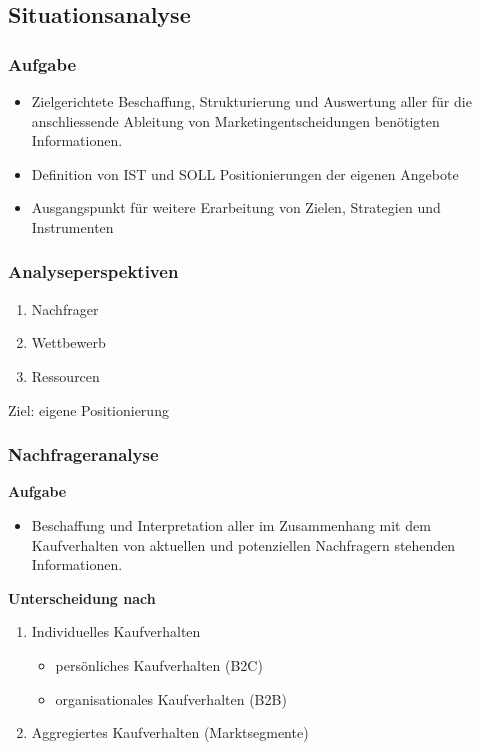 \subsection{Situationsanalyse}
\subsubsection{Aufgabe}
\begin{itemize}
	\item Zielgerichtete Beschaffung, Strukturierung und Auswertung aller für die anschliessende Ableitung von Marketingentscheidungen benötigten Informationen.
	\item Definition von IST und SOLL Positionierungen der eigenen Angebote
	\item Ausgangspunkt für weitere Erarbeitung von Zielen, Strategien und Instrumenten
\end{itemize}

\subsubsection{Analyseperspektiven}
\begin{multicols}{3}
	\begin{enumerate}
		\item Nachfrager
		\item Wettbewerb
		\item Ressourcen
	\end{enumerate}
\end{multicols}
Ziel: eigene Positionierung

\subsubsection{Nachfrageranalyse}
\textbf{Aufgabe}
\begin{itemize}
	\item Beschaffung und Interpretation aller im Zusammenhang mit dem Kaufverhalten von aktuellen und potenziellen Nachfragern stehenden Informationen.
\end{itemize}

\textbf{Unterscheidung nach}
\begin{enumerate}
	\item Individuelles Kaufverhalten
	\begin{itemize}
		\item persönliches Kaufverhalten (B2C)
		\item organisationales Kaufverhalten (B2B)
	\end{itemize}
	\item Aggregiertes Kaufverhalten (Marktsegmente)
\end{enumerate}

